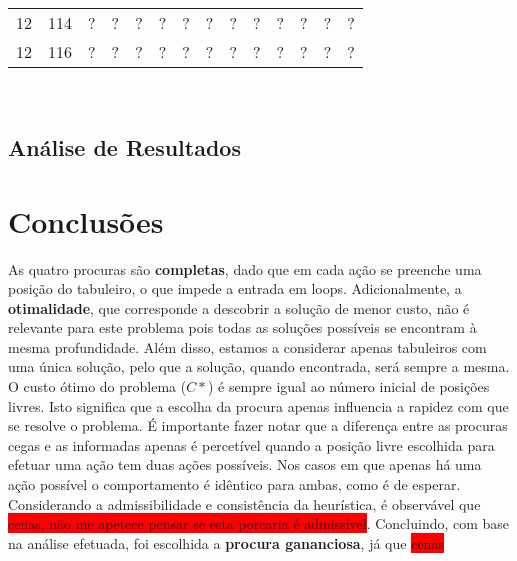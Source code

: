 \documentclass[12pt,a4paper]{article}
\begin{document}
\begin{adjustbox}{width={\textwidth}, totalheight={\textheight}, keepaspectratio}
\begin{tabular}{ll cccc cccc cccc}
    12                        & 114                                       & ?                               & ?                                  & ?  & ?  & ?   & ?   & ?  & ?  & ?   & ?   & ?  & ?  \\
    12                        & 116                                       & ?                               & ?                                  & ?  & ?  & ?   & ?   & ?  & ?  & ?   & ?   & ?  & ?  \\
    \bottomrule
  \end{tabular}
\end{adjustbox} \\


\subsection{Análise de Resultados}


\section{Conclusões}

As quatro procuras são \textbf{completas}, dado que em cada ação se preenche uma posição do tabuleiro,
o que impede a entrada em loops.
Adicionalmente, a \textbf{otimalidade}, que corresponde a descobrir a solução de menor custo,
não é relevante para este problema pois todas as soluções possíveis se encontram à mesma profundidade.
Além disso, estamos a considerar apenas tabuleiros com uma única solução,
pelo que a solução, quando encontrada, será sempre a mesma.
O custo ótimo do problema (\(C*\)) é sempre igual ao número inicial de posições livres.
Isto significa que a escolha da procura apenas influencia a rapidez com que se resolve o problema.
É importante fazer notar que a diferença entre as procuras cegas e as informadas
apenas é percetível quando a posição livre escolhida para efetuar uma ação tem duas ações possíveis.
Nos casos em que apenas há uma ação possível o comportamento é idêntico para ambas, como é de esperar.
Considerando a admissibilidade e consistência da heurística, é observável que
\colorbox{red}{cenas, não me apetece pensar se esta porcaria é admissível}.
Concluindo, com base na análise efetuada, foi escolhida a \textbf{procura gananciosa}, já que
\colorbox{red}{cenas}
\end{document}
